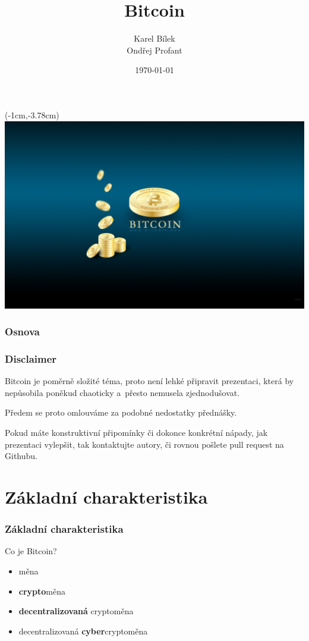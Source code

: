 \documentclass[xetex]{beamer}
\title{Bitcoin}
\author{Karel Bílek\\Ondřej Profant}
\institute[Piráti]{Česká pirátská strana}
\date{\today}
\begin{document}
\begin{frame}
	\begin{textblock*}{0cm}(-1cm,-3.78cm)
  \includegraphics[scale=0.6]{images/intro.jpg}
  \end{textblock*}
\end{frame}

\begin{frame}
  \titlepage
\end{frame}

\begin{frame}
  \frametitle{Osnova}
  \tableofcontents
\end{frame}	

\begin{frame}
	\frametitle{Disclaimer}
	Bitcoin je poměrně složité téma, proto není lehké připravit prezentaci, která by nepůsobila poněkud chaoticky
	a~přesto nemusela zjednodušovat.

	\bigskip

	Předem se proto omlouváme za podobné nedostatky přednášky.

	\bigskip

	Pokud máte konstruktivní připomínky či dokonce konkrétní nápady, jak prezentaci vylepšit, tak kontaktujte autory, či rovnou pošlete pull request na Githubu.
\end{frame}

\section{Základní charakteristika}

\begin{frame}
	\frametitle{Základní charakteristika}

	Co je Bitcoin?
	\begin{itemize}
		\item<1-4> měna
		\item<2-4> \textbf{crypto}měna
		\item<3-4> \textbf{decentralizovaná} cryptoměna
		\item<4-4> decentralizovaná \textbf{cyber}cryptoměna
	\end{itemize}
\end{frame}
\end{document}
